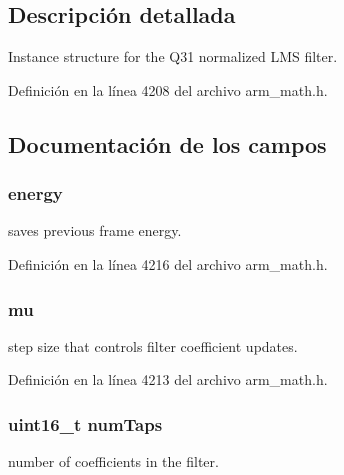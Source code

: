 \subsection{Descripción detallada}
Instance structure for the Q31 normalized L\+MS filter. 

Definición en la línea 4208 del archivo arm\+\_\+math.\+h.



\subsection{Documentación de los campos}
\subsubsection[{\texorpdfstring{energy}{energy}}]{ energy}\hypertarget{structarm__lms__norm__instance__q31_a012fee0f71095d2557bb633e73ef7355}{}\label{structarm__lms__norm__instance__q31_a012fee0f71095d2557bb633e73ef7355}
saves previous frame energy. 

Definición en la línea 4216 del archivo arm\+\_\+math.\+h.

\subsubsection[{\texorpdfstring{mu}{mu}}]{ mu}\hypertarget{structarm__lms__norm__instance__q31_a21ab4237a726ea7751f5026d89d2e577}{}\label{structarm__lms__norm__instance__q31_a21ab4237a726ea7751f5026d89d2e577}
step size that controls filter coefficient updates. 

Definición en la línea 4213 del archivo arm\+\_\+math.\+h.

\subsubsection[{\texorpdfstring{num\+Taps}{numTaps}}]{\setlength{\rightskip}{0pt plus 5cm}uint16\+\_\+t num\+Taps}\hypertarget{structarm__lms__norm__instance__q31_a751941891e47f522a7f5375fe8990aac}{}\label{structarm__lms__norm__instance__q31_a751941891e47f522a7f5375fe8990aac}
number of coefficients in the filter. 

